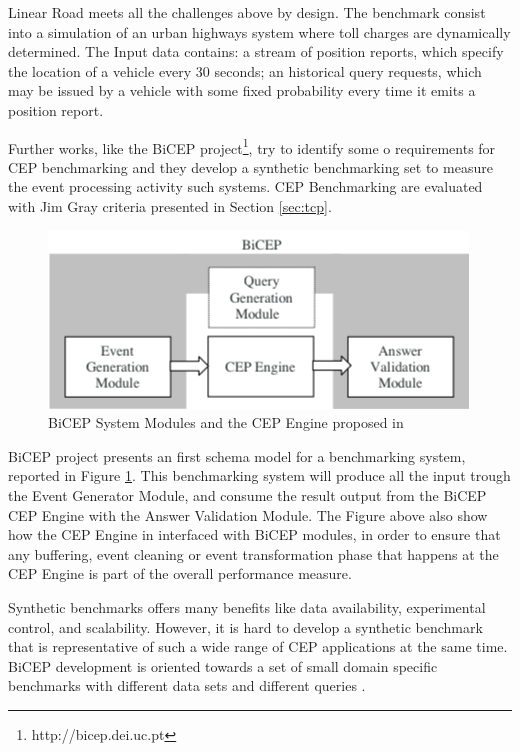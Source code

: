Linear Road meets all the challenges above by design. The benchmark consist into a simulation of an urban highways system where toll charges are dynamically determined. The Input data contains: a stream of position reports, which specify the location of a vehicle every 30 seconds; an historical query requests, which may be issued by a vehicle with some fixed probability every time it emits a position report.

Further works, like the BiCEP project\footnote{http://bicep.dei.uc.pt}, try to identify some o requirements for CEP benchmarking and they develop a synthetic benchmarking set to measure the event processing activity such systems. CEP Benchmarking are evaluated with Jim Gray criteria presented in Section \ref{sec:tcp}. 

\begin{figure}[tbh]
  \centering
	\includegraphics[width=\linewidth]{images/bicep_schema}
	\caption{BiCEP System Modules and the CEP Engine proposed in \cite{bizarro:DSP:2007:1143}} 
  	\label{fig:bicep-schema}
\end{figure}

BiCEP project presents an first schema model for a benchmarking system, reported in Figure \ref{fig:bicep-schema}. This benchmarking system will produce all the input trough the Event Generator Module, and consume the result output from the BiCEP CEP Engine with the Answer Validation Module. The Figure above also show how the CEP Engine in interfaced with BiCEP modules, in order to ensure that any buffering, event cleaning or event transformation phase that happens at the CEP Engine is part of the overall performance measure. 

Synthetic benchmarks offers many benefits like data availability, experimental control, and scalability. However, it is hard to develop a synthetic benchmark that is representative of such a wide range of CEP applications at the same time. BiCEP development is oriented towards a set of small domain specific benchmarks with different data sets and different queries \cite{bizarro:DSP:2007:1143}.

